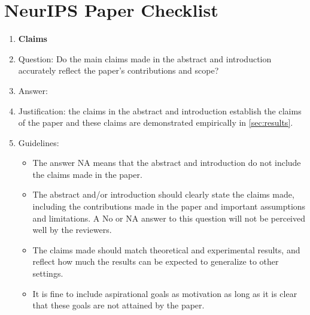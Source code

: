 \documentclass{article}
\begin{document}
\FloatBarrier

\newpage
\section*{NeurIPS Paper Checklist}

\begin{enumerate}

\item {\bf Claims}
    \item[] Question: Do the main claims made in the abstract and introduction accurately reflect the paper's contributions and scope?
    \item[] Answer: \answerYes{} %
    \item[] Justification: the claims in the abstract and introduction establish the claims of the paper and these claims are demonstrated empirically in \cref{sec:results}.
    \item[] Guidelines:
    \begin{itemize}
        \item The answer NA means that the abstract and introduction do not include the claims made in the paper.
        \item The abstract and/or introduction should clearly state the claims made, including the contributions made in the paper and important assumptions and limitations. A No or NA answer to this question will not be perceived well by the reviewers. 
        \item The claims made should match theoretical and experimental results, and reflect how much the results can be expected to generalize to other settings. 
        \item It is fine to include aspirational goals as motivation as long as it is clear that these goals are not attained by the paper. 
    \end{itemize}


\end{enumerate}
\end{document}
